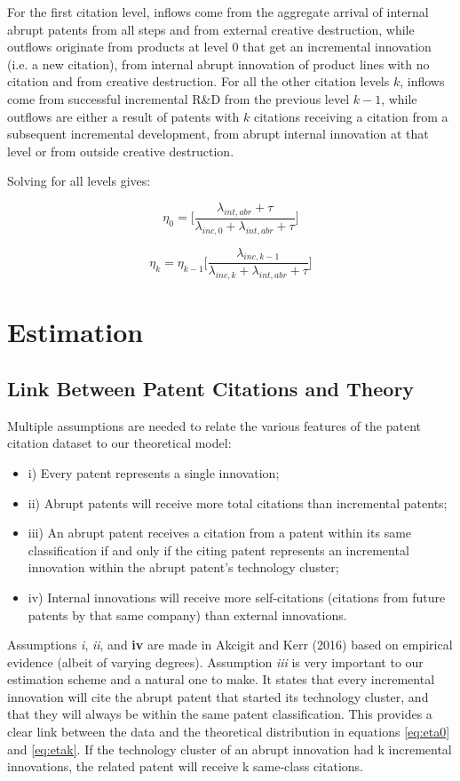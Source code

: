 \documentclass[letterpaper,12pt]{article}
\theoremstyle{definition}
\begin{document}
For the first citation level, inflows come from the aggregate arrival of internal abrupt patents from all steps and from external creative destruction, while outflows originate from products at level 0 that get an incremental innovation (i.e. a new citation), from internal abrupt innovation of product lines with no citation and from creative destruction. For all the other citation levels $k$, inflows come from successful incremental R\&D from the previous level $k-1$, while outflows are either a result of patents with $k$ citations receiving a citation from a subsequent incremental development, from abrupt internal innovation at that level or from outside creative destruction.

Solving for all levels gives:

\begin{equation} \label{eq:eta0}
\eta_0 = \Big[\frac{\lambda_{int,abr} + \tau}{\lambda_{inc,0} +\lambda_{int,abr} + \tau}\Big]
\end{equation}

\begin{equation} \label{eq:etak}
\eta_k = \eta_{k-1}\Big[\frac{\lambda_{inc,k-1}}{\lambda_{inc,k} +\lambda_{int,abr} + \tau}\Big]
\end{equation}

\section{Estimation}\label{sec:Estimation}

\subsection{Link Between Patent Citations and Theory}
Multiple assumptions are needed to relate the various features of the patent citation dataset to our theoretical model:
\begin{itemize}
	\item i) Every patent represents a single innovation;
	\item ii) Abrupt patents will receive more total citations than incremental patents;
	\item iii) An abrupt patent receives a citation from a patent within its same classification if and only if the citing patent represents an incremental innovation within the abrupt patent’s technology cluster;
	\item iv) Internal innovations will receive more self-citations (citations from future patents by that same company) than external innovations.
\end{itemize}
Assumptions \textit{i}, \textit{ii}, and \textbf{iv} are made in Akcigit and Kerr (2016) based on empirical evidence (albeit of varying degrees). Assumption \textit{iii} is very important to our estimation scheme and a natural one to make. It states that every incremental innovation will cite the abrupt patent that started its technology cluster, and that they will always be within the same patent classification. This provides a clear link between the data and the theoretical distribution in equations \ref{eq:eta0} and \ref{eq:etak}. If the technology cluster of an abrupt innovation had k incremental innovations, the related patent will receive k same-class citations.
\end{document}
